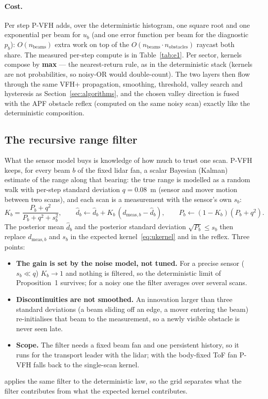 \paragraph{Cost.} Per step P-VFH adds, over the deterministic histogram,
one square root and one exponential per beam for $u_b$ (and one error
function per beam for the diagnostic $p_b$): $O(n_{\mathrm{beams}})$ extra
work on top of the $O(n_{\mathrm{beams}} \cdot n_{\mathrm{obstacles}})$
raycast both share. The measured per-step compute is in
Table~\ref{tab:e1}.
Per sector, kernels compose by \textbf{max} --- the nearest-return rule, as in
the deterministic stack (kernels are not probabilities, so noisy-OR would
double-count). The two layers then flow through the same VFH+ propagation,
smoothing, threshold, valley search and hysteresis as
Section~\ref{sec:algorithms}, and the chosen valley direction is fused with
the APF obstacle reflex (computed on the same noisy scan) exactly like the
deterministic composition.

\subsection{The recursive range filter}
\label{sec:rfilter}

What the sensor model buys is knowledge of how much to trust one scan.
P-VFH keeps, for every beam $b$ of the fixed lidar fan, a scalar Bayesian
(Kalman) estimate of the range along that bearing: the true range is
modelled as a random walk with per-step standard deviation $q = 0.08$~m
(sensor and mover motion between two scans), and each scan is a
measurement with the sensor's own $s_b$:
\begin{equation}
K_b = \frac{P_b + q^2}{P_b + q^2 + s_b^2},\qquad
\hat d_b \leftarrow \hat d_b + K_b\,(d_{\mathrm{meas},b} - \hat d_b),\qquad
P_b \leftarrow (1 - K_b)(P_b + q^2).
\label{eq:rfilter}
\end{equation}
The posterior mean $\hat d_b$ and the posterior standard deviation
$\sqrt{P_b} \le s_b$ then replace $d_{\mathrm{meas},b}$ and $s_b$ in the
expected kernel~\eqref{eq:ukernel} and in the reflex. Three points:
\begin{itemize}[leftmargin=1.6em]
\item \textbf{The gain is set by the noise model, not tuned.} For a
precise sensor ($s_b \ll q$) $K_b \to 1$ and nothing is filtered, so the
deterministic limit of Proposition~1 survives; for a noisy one the filter
averages over several scans.
\item \textbf{Discontinuities are not smoothed.} An innovation larger than
three standard deviations (a beam sliding off an edge, a mover entering
the beam) re-initialises that beam to the measurement, so a newly visible
obstacle is never seen late.
\item \textbf{Scope.} The filter needs a fixed beam fan and one persistent
history, so it runs for the transport leader with the lidar; with the
body-fixed ToF fan P-VFH falls back to the single-scan kernel.
\end{itemize}
 applies the same filter to the deterministic law, so
the grid separates what the filter contributes from what the expected
kernel contributes.

